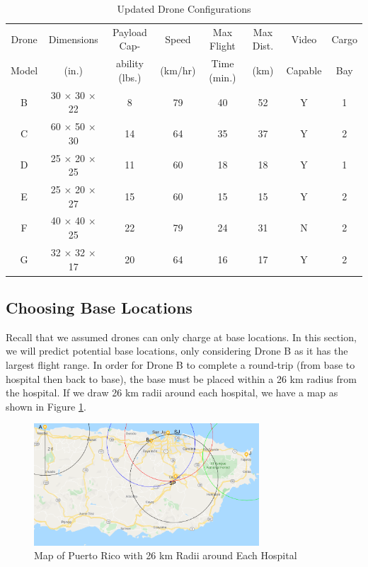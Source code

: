 \begin{table}[h]
    \centering
    \begin{tabular}{c|c|c|c|c|c|c|c}
    \hline Drone & Dimensions & Payload Cap- & Speed &  Max Flight & Max Dist. & Video & Cargo\\
    Model & (in.) & ability (lbs.) & (km/hr) & Time (min.)& (km) & Capable & Bay \\
    \hline
    B & 30 $\times$ 30 $\times$ 22 & 8 & 79 & 40 & 52 & Y & 1 \\
    C & 60 $\times$ 50 $\times$ 30 & 14 & 64 & 35 & 37 & Y & 2 \\
    D & 25 $\times$ 20 $\times$ 25 & 11 & 60 & 18 & 18 & Y & 1 \\
    E & 25 $\times$ 20 $\times$ 27 & 15 & 60 & 15 & 15 & Y & 2 \\
    F & 40 $\times$ 40 $\times$ 25 & 22 & 79 & 24 & 31 & N & 2 \\
    G & 32 $\times$ 32 $\times$ 17 & 20 & 64 & 16 & 17 & Y & 2 
    \end{tabular}
    \caption{Updated Drone Configurations}
    \label{tab:updated_drones_info}
\end{table}


\subsection{Choosing Base Locations}

Recall that we assumed drones can only charge at base locations. In this section, we will predict potential base locations, only considering Drone B as it has the largest flight range. In order for Drone B to complete a round-trip (from base to hospital then back to base), the base must be placed within a 26 km radius from the hospital. If we draw 26 km radii around each hospital, we have a map as shown in Figure \ref{fig:hospital_radius_map}. 

\begin{figure}[!ht]
    \centering
    \includegraphics[width=0.75\textwidth]{hospital_radius_map.png}
    \caption{Map of Puerto Rico with 26 km Radii around Each Hospital}
    \label{fig:hospital_radius_map}
\end{figure}

